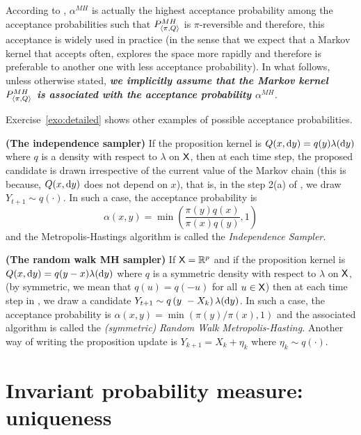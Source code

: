 \documentclass[english,graybox,envcountchap,envcountsame,sectrefs,shortlabels]{svmono}
\theoremstyle{style}
\begin{document}
According to , $\alpha^{MH}$ is actually the highest
acceptance probability among the acceptance probabilities such that
$P_{\langle\pi,Q\rangle}^{MH}$ is $\pi$-reversible and therefore, this acceptance
is widely used in practice (in the sense that we expect that a Markov
kernel that accepts often, explores the space more rapidly and therefore
is preferable to another one with less acceptance probability). In
what follows, unless otherwise stated, \textbf{\emph{we implicitly
assume that the Markov kernel $P_{\langle\pi,Q\rangle}^{MH}$ is associated with the acceptance
probability $\alpha^{MH}$}}\emph{.}

Exercise~\ref{exo:detailed} shows other examples of possible acceptance probabilities.


\begin{example}
\textbf{(The independence sampler)} If the proposition kernel is $Q(x,\mathrm{d} y)=q(y)\lambda(\mathrm{d} y)$
where $q$ is a density with respect to $\lambda$ on $\mathsf{X}$, then at each time
step, the proposed candidate is drawn irrespective of the current
value of the Markov chain (this is because, $Q(x,\mathrm{d} y)$ does not
depend on $x$), that is, in the step 2(a) of , we draw
$Y_{t+1}\sim q\left(\cdot\right)$. In such  a case, the acceptance probability
is 
$$
\alpha(x,y)=\min\left(\frac{\pi(y)q(x)}{\pi(x)q(y)},1\right)
$$
and the Metropolis-Hastings algorithm is called the \emph{Independence
Sampler. }
\end{example}

\begin{example}
\textbf{(The random walk MH sampler)}  If $\mathsf{X}=\mathbb{R}^{p}$ and if
the proposition kernel is $Q(x,\mathrm{d} y)=q(y-x)\lambda(\mathrm{d} y)$ where
$q$ is a symmetric density with respect to $\lambda$ on $\mathsf{X}$, (by symmetric,
we mean that $q(u)=q(-u)$ for all $u\in\mathsf{X}$) then at each time
step in , we draw a candidate $Y_{t+1}\sim q\left(y\ -X_{k}\right)\lambda(\mathrm{d} y)$.
In such a case, the acceptance probability is $\alpha(x,y)=\min\left(\pi(y)/\pi(x),1\right)$
and the associated algorithm is called the \emph{(symmetric)} \emph{Random
Walk Metropolis-Hasting.}\textbf{ }Another way of writing the proposition
update is $Y_{k+1}=X_{k}+\eta_{k}$ where $\eta_{k}\sim q(\cdot)$.\textbf{ }
\end{example}

\section{Invariant probability measure: uniqueness}
\end{document}
